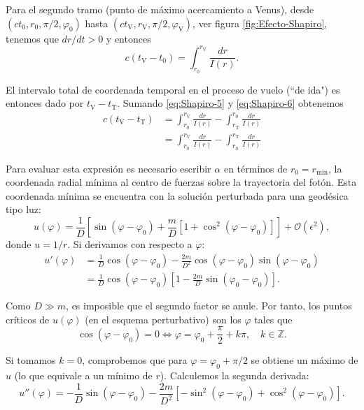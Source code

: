 \documentclass[letterpaper,11pt]{article}
\begin{document}
Para el segundo tramo (punto de máximo acercamiento a Venus), desde $(ct_0,r_0,\pi/2,\varphi_0)$ hasta $(ct_{\text{V}}, r_{\text{V}},\pi/2,\varphi_{\text{V}})$, ver figura \ref{fig:Efecto-Shapiro}, tenemos que $dr/dt > 0$ y entonces
\begin{equation}
c(t_{\text{V}} - t_0) = \int_{r_0}^{r_{\text{V}}} \frac{dr}{I(r)}. \label{eq:Shapiro-6}
\end{equation} 

El intervalo total de coordenada temporal en el proceso de vuelo (``de ida") es entonces dado por $t_{\text{V}} - t_{\text{T}}$. Sumando \eqref{eq:Shapiro-5} y \eqref{eq:Shapiro-6} obtenemos
\begin{align}
c(t_{\text{V}} - t_{\text{T}}) &= \int_{r_0}^{r_{\text{V}}} \frac{dr}{I(r)} - \int_{r_{\text{T}}}^{r_0} \frac{dr}{I(r)} \nonumber \\
&= \int_{r_0}^{r_{\text{V}}} \frac{dr}{I(r)} - \int_{r_0}^{r_{\text{T}}} \frac{dr}{I(r)}  \label{eq:Shapiro-6.5}
\end{align}

Para evaluar esta expresión es necesario escribir $\alpha$ en términos de $r_0 = r_{\text{min}}$, la coordenada radial mínima al centro de fuerzas sobre la trayectoria del fotón. Esta coordenada mínima se encuentra con la solución perturbada para una geodésica tipo luz:
\begin{equation}
u(\varphi) = \frac{1}{D} \left[ \sin(\varphi-\varphi_0) + \frac{m}{D}[1 + \cos^2(\varphi-\varphi_0)]\right] + \mathcal{O}(\epsilon^2),
\end{equation}
donde $u = 1/r$. Si derivamos con respecto a $\varphi$:
\begin{align}
u'(\varphi) &= \frac{1}{D} \cos(\varphi - \varphi_0) - \frac{2m}{D^2} \cos(\varphi-\varphi_0) \sin(\varphi-\varphi_0) \nonumber \\
&= \frac{1}{D}\cos(\varphi - \varphi_0) \left[ 1 - \frac{2m}{D} \sin(\varphi_0 - \varphi_0) \right].
\end{align}

Como $D \gg m$, es imposible que el segundo factor se anule. Por tanto, los puntos críticos de $u(\varphi)$ (en el esquema perturbativo) son los $\varphi$ tales que 
\begin{equation}
\cos(\varphi - \varphi_0) = 0 \Leftrightarrow \varphi = \varphi_0 + \frac{\pi}{2} + k\pi, \quad k \in \mathbb{Z}. 
\end{equation} 

Si tomamos $k = 0$, comprobemos que para $\varphi = \varphi_0 + \pi/2$ se obtiene un máximo de $u$ (lo que equivale a un mínimo de $r$).  Calculemos la segunda derivada:
\begin{equation}
u''(\varphi) = - \frac{1}{D} \sin(\varphi - \varphi_0) - \frac{2m}{D^2} \left[-\sin^2(\varphi - \varphi_0) + \cos^2(\varphi-\varphi_0)\right].
\end{equation}
\end{document}
